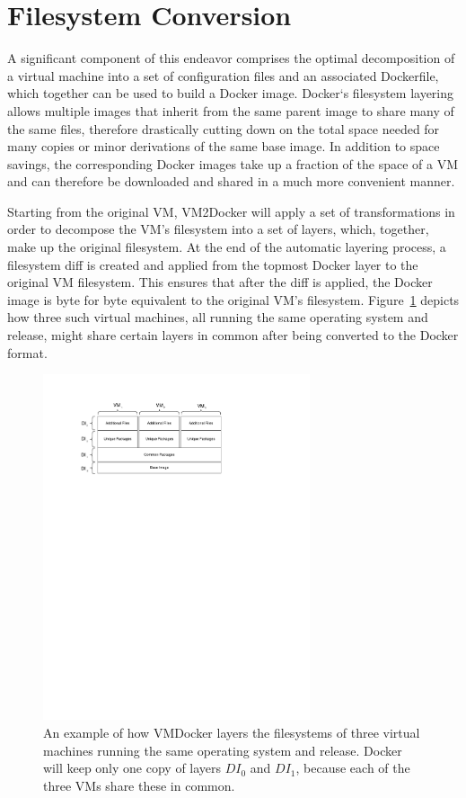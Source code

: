 \section{Filesystem Conversion}
\label{sec:fsconversion}
A significant component of this endeavor comprises the optimal decomposition of a virtual machine into a set of configuration files and an associated Dockerfile, which together can be used to build a Docker image. Docker`s filesystem layering allows multiple images that inherit from the same parent image to share many of the same files, therefore drastically cutting down on the total space needed for many copies or minor derivations of the same base image. In addition to space savings, the corresponding Docker images take up a fraction of the space of a VM and can therefore be downloaded and shared in a much more convenient manner.

Starting from the original VM, VM2Docker will apply a set of transformations in order to decompose the VM's filesystem into a set of layers, which, together, make up the original filesystem. At the end of the automatic layering process, a filesystem diff is created and applied from the topmost Docker layer to the original VM filesystem. This ensures that after the diff is applied, the Docker image is byte for byte equivalent to the original VM's filesystem. Figure~\ref{fig:layering} depicts how three such virtual machines, all running the same operating system and release, might share certain layers in common after being converted to the Docker format.

\begin{figure}[h]

\centering
    \includegraphics[width=0.7\textwidth]{layering.pdf}
    \caption{An example of how VMDocker layers the filesystems of three virtual machines running the same operating system and release. Docker will keep only one copy of layers $DI_0$ and $DI_1$, because each of the three VMs share these in common.}
\label{fig:layering}
\end{figure}


